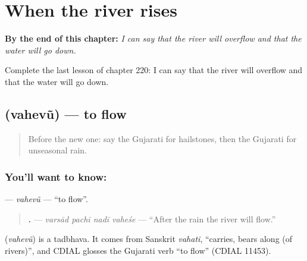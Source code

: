 
\chapter{When the river rises}
\label{ch:gu-when-the-river-rises}

\begin{chapteropening}
\textbf{By the end of this chapter:} \emph{I can say that the river will overflow and that the water will go down.}

Complete the last lesson of chapter 220: I can say that the river will overflow and that the water will go down.
\end{chapteropening}

\section[\texorpdfstring{\gu{વહેવું} (vahevũ)}{વહેવું (vahevũ)}]{ (vahevũ) — to flow}

\label{lesson:GU-C220-vahevu}



\begin{quote}
Before the new one: say the Gujarati for hailstones, then the Gujarati for unseasonal rain.
\end{quote}

\subsection*{You'll want to know: }
\textbf{} — \emph{vahevũ} — \textquotedblleft{}to flow\textquotedblright{}.

\begin{quote}
\textbf{   .} — \emph{varsād pachī nadī vaheśe} — \textquotedblleft{}After the rain the river will flow.\textquotedblright{}
\end{quote}

\begin{cousinweb}
\textbf{} (\emph{vahevũ}) is a tadbhava. It comes from Sanskrit \emph{vahati}, \textquotedblleft{}carries, bears along (of rivers)\textquotedblright{}, and CDIAL glosses the Gujarati verb \textquotedblleft{}to flow\textquotedblright{} (CDIAL 11453).
\end{cousinweb}

